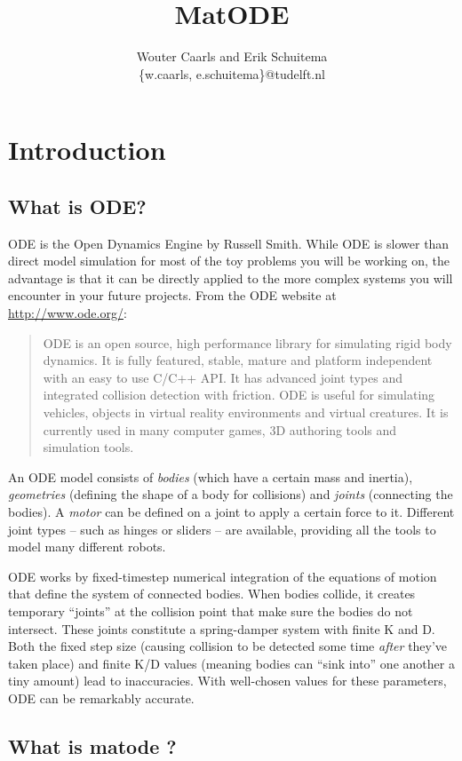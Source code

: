 \documentclass{article}
\title{MatODE}
\author{Wouter Caarls and Erik Schuitema\\
\{w.caarls, e.schuitema\}@tudelft.nl}
\begin{document}
\maketitle
\tableofcontents
\section{Introduction}
\subsection{What is ODE?}

ODE is the Open Dynamics Engine by Russell Smith. While ODE is slower than direct model simulation for most of the toy problems you will be working on, the advantage is that it can be directly applied to the more complex systems you will encounter in your future projects. From the ODE website at \url{http://www.ode.org/}:
\begin{quote}
ODE is an open source, high performance library for simulating rigid body dynamics. It is fully featured, stable, mature and platform independent with an easy to use C/C++ API. It has advanced joint types and integrated collision detection with friction. ODE is useful for simulating vehicles, objects in virtual reality environments and virtual creatures. It is currently used in many computer games, 3D authoring tools and simulation tools.
\end{quote}

An ODE model consists of \emph{bodies} (which have a certain mass and inertia), \emph{geometries} (defining the shape of a body for collisions) and \emph{joints} (connecting the bodies). A \emph{motor} can be defined on a joint to apply a certain force to it. Different joint types -- such as hinges or sliders -- are available, providing all the tools to model many different robots.

ODE works by fixed-timestep numerical integration of the equations of motion that define the system of connected bodies. When bodies collide, it creates temporary ``joints'' at the collision point that make sure the bodies do not intersect. These joints constitute a spring-damper system with finite K and D. Both the fixed step size (causing collision to be detected some time \emph{after} they've taken place) and finite K/D values (meaning bodies can ``sink into'' one another a tiny amount) lead to inaccuracies. With well-chosen values for these parameters, ODE can be remarkably accurate.

\subsection{What is matode ?}
\end{document}
